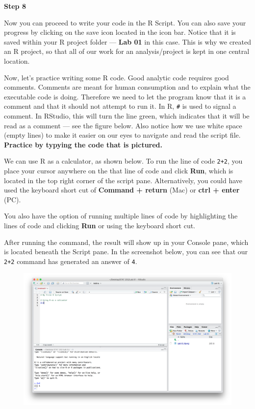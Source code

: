 \documentclass[]{book}
\theoremstyle{definition}
\theoremstyle{definition}
\theoremstyle{definition}
\theoremstyle{remark}
\begin{document}
\textbf{Step 8}

Now you can proceed to write your code in the R Script. You can also
save your progress by clicking on the save icon located in the icon bar.
Notice that it is saved within your R project folder --- \textbf{Lab 01}
in this case. This is why we created an R project, so that all of our
work for an analysis/project is kept in one central location.

Now, let's practice writing some R code. Good analytic code requires
good comments. Comments are meant for human consumption and to explain
what the executable code is doing. Therefore we need to let the program
know that it is a comment and that it should not attempt to run it. In
R, \texttt{\#} is used to signal a comment. In RStudio, this will turn
the line green, which indicates that it will be read as a comment ---
see the figure below. Also notice how we use white space (empty lines)
to make it easier on our eyes to navigate and read the script file.
\textbf{Practice by typying the code that is pictured.}

We can use R as a calculator, as shown below. To run the line of code
\texttt{2+2}, you place your cursor anywhere on the that line of code
and click \textbf{Run}, which is located in the top right corner of the
script pane. Alternatively, you could have used the keyboard short cut
of \textbf{Command + return} (Mac) or \textbf{ctrl + enter} (PC).

You also have the option of running multiple lines of code by
highlighting the lines of code and clicking \textbf{Run} or using the
keyboard short cut.

After running the command, the result will show up in your Console pane,
which is located beneath the Script pane. In the screenshot below, you
can see that our \texttt{2+2} command has generated an answer of
\texttt{4}.

\begin{figure}[htbp]
\centering
\includegraphics{./assets/images/01-07.png}
\caption{}
\end{figure}
\end{document}
